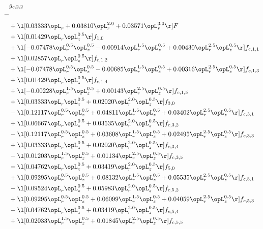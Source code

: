 \begin{alignat}{2} 
\label{eq:g_22_0} 
& g_{c,2,2} \nonumber \\ 
 = \\ 
& + \l[  0.03333 \opL_r +  0.03810 \opL_r^{2.0} +  0.03571 \opL_r^{3.0}  \r] F \nonumber \\ 
& + \l[  0.01429 \opL_r \opL_z^{0.5}  \r] f_{1,0} \nonumber \\ 
& + \l[  -0.07478 \opL_r^{0.5} \opL_z^{0.5}   -0.00914 \opL_r^{1.5} \opL_z^{0.5} +  0.00430 \opL_r^{2.5} \opL_z^{0.5}  \r] f_{c,1,1} \nonumber \\ 
& + \l[  0.02857 \opL_r \opL_z^{0.5}  \r] f_{c,1,2} \nonumber \\ 
& + \l[  -0.07478 \opL_r^{0.5} \opL_z^{0.5}   -0.00685 \opL_r^{1.5} \opL_z^{0.5} +  0.00316 \opL_r^{2.5} \opL_z^{0.5}  \r] f_{c,1,3} \nonumber \\ 
& + \l[  0.01429 \opL_r \opL_z^{0.5}  \r] f_{c,1,4} \nonumber \\ 
& + \l[  -0.00228 \opL_r^{1.5} \opL_z^{0.5} +  0.00143 \opL_r^{2.5} \opL_z^{0.5}  \r] f_{c,1,5} \nonumber \\ 
& + \l[  0.03333 \opL_r \opL_z^{0.5} +  0.02020 \opL_r^{2.0} \opL_z^{0.5}  \r] f_{3,0} \nonumber \\ 
& - \l[  0.12117 \opL_r^{0.5} \opL_z^{0.5} +  0.04811 \opL_r^{1.5} \opL_z^{0.5} +  0.03402 \opL_r^{2.5} \opL_z^{0.5}  \r] f_{c,3,1} \nonumber \\ 
& + \l[  0.06667 \opL_r \opL_z^{0.5} +  0.03535 \opL_r^{2.0} \opL_z^{0.5}  \r] f_{c,3,2} \nonumber \\ 
& - \l[  0.12117 \opL_r^{0.5} \opL_z^{0.5} +  0.03608 \opL_r^{1.5} \opL_z^{0.5} +  0.02495 \opL_r^{2.5} \opL_z^{0.5}  \r] f_{c,3,3} \nonumber \\ 
& + \l[  0.03333 \opL_r \opL_z^{0.5} +  0.02020 \opL_r^{2.0} \opL_z^{0.5}  \r] f_{c,3,4} \nonumber \\ 
& - \l[  0.01203 \opL_r^{1.5} \opL_z^{0.5} +  0.01134 \opL_r^{2.5} \opL_z^{0.5}  \r] f_{c,3,5} \nonumber \\ 
& - \l[  0.04762 \opL_r \opL_z^{0.5} +  0.03419 \opL_r^{2.0} \opL_z^{0.5}  \r] f_{5,0} \nonumber \\ 
& + \l[  0.09295 \opL_r^{0.5} \opL_z^{0.5} +  0.08132 \opL_r^{1.5} \opL_z^{0.5} +  0.05535 \opL_r^{2.5} \opL_z^{0.5}  \r] f_{c,5,1} \nonumber \\ 
& - \l[  0.09524 \opL_r \opL_z^{0.5} +  0.05983 \opL_r^{2.0} \opL_z^{0.5}  \r] f_{c,5,2} \nonumber \\ 
& + \l[  0.09295 \opL_r^{0.5} \opL_z^{0.5} +  0.06099 \opL_r^{1.5} \opL_z^{0.5} +  0.04059 \opL_r^{2.5} \opL_z^{0.5}  \r] f_{c,5,3} \nonumber \\ 
& - \l[  0.04762 \opL_r \opL_z^{0.5} +  0.03419 \opL_r^{2.0} \opL_z^{0.5}  \r] f_{c,5,4} \nonumber \\ 
& + \l[  0.02033 \opL_r^{1.5} \opL_z^{0.5} +  0.01845 \opL_r^{2.5} \opL_z^{0.5}  \r] f_{c,5,5} \nonumber \\ 
\end{alignat} 


